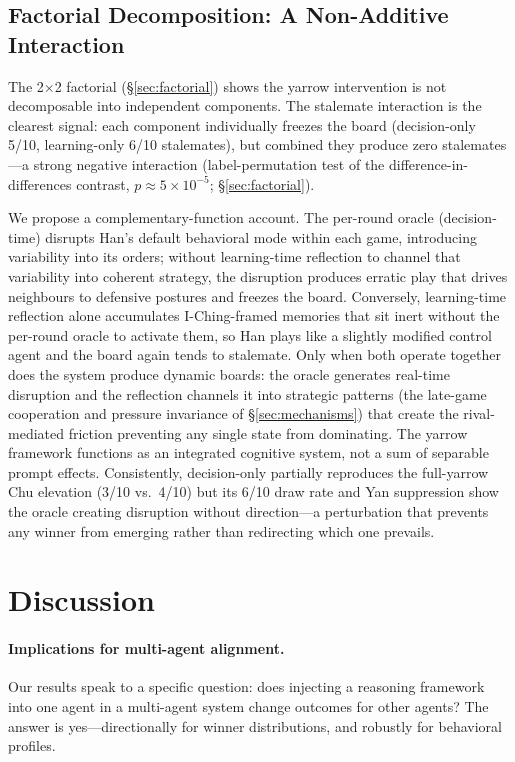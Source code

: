 \documentclass[11pt]{article}
\begin{document}
\subsection{Factorial Decomposition: A Non-Additive Interaction}
\label{sec:factorial-analysis}

The 2$\times$2 factorial (\S\ref{sec:factorial}) shows the yarrow intervention is not decomposable into independent components. The stalemate interaction is the clearest signal: each component individually freezes the board (decision-only 5/10, learning-only 6/10 stalemates), but combined they produce zero stalemates---a strong negative interaction (label-permutation test of the difference-in-differences contrast, $p \approx 5\times10^{-5}$; \S\ref{sec:factorial}).

We propose a complementary-function account. The per-round oracle (decision-time) disrupts Han's default behavioral mode within each game, introducing variability into its orders; without learning-time reflection to channel that variability into coherent strategy, the disruption produces erratic play that drives neighbours to defensive postures and freezes the board. Conversely, learning-time reflection alone accumulates I-Ching-framed memories that sit inert without the per-round oracle to activate them, so Han plays like a slightly modified control agent and the board again tends to stalemate. Only when both operate together does the system produce dynamic boards: the oracle generates real-time disruption and the reflection channels it into strategic patterns (the late-game cooperation and pressure invariance of \S\ref{sec:mechanisms}) that create the rival-mediated friction preventing any single state from dominating. The yarrow framework functions as an integrated cognitive system, not a sum of separable prompt effects. Consistently, decision-only partially reproduces the full-yarrow Chu elevation (3/10 vs.\ 4/10) but its 6/10 draw rate and Yan suppression show the oracle creating disruption without direction---a perturbation that prevents any winner from emerging rather than redirecting which one prevails.


\section{Discussion}
\label{sec:discussion}

\paragraph{Implications for multi-agent alignment.}
Our results speak to a specific question: does injecting a reasoning framework into one agent in a multi-agent system change outcomes for other agents? The answer is yes---directionally for winner distributions, and robustly for behavioral profiles.
\end{document}
